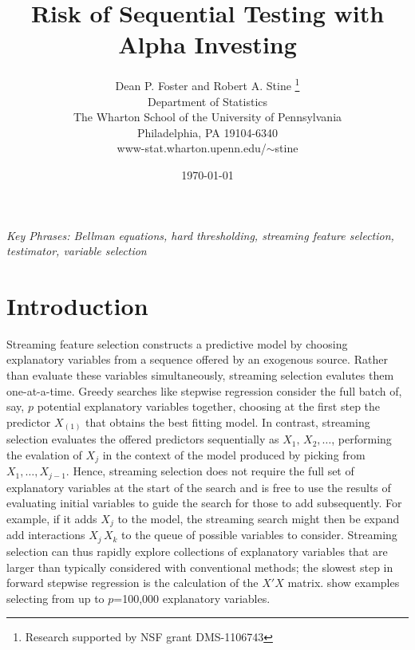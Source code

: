 \documentclass[12pt]{article}
\title{ Risk of Sequential Testing with Alpha Investing }
\author{
        Dean P. Foster and Robert A. Stine
        \thanks{Research supported by NSF grant DMS-1106743 }  \\
        Department of Statistics            \\
        The Wharton School of the University of Pennsylvania \\
        Philadelphia, PA 19104-6340                          \\
        www-stat.wharton.upenn.edu/$\sim$stine 
}
\date{\today}
\begin{document}
\maketitle 


\vspace{0.05in}

\noindent
{\it Key Phrases: Bellman equations, hard thresholding, streaming feature
 selection, testimator, variable selection}

\clearpage


\section{ Introduction }


 Streaming feature selection constructs a predictive model by choosing
 explanatory variables from a sequence offered by an exogenous source.  Rather
 than evaluate these variables simultaneously, streaming selection evalutes them
 one-at-a-time.  Greedy searches like stepwise regression consider the full
 batch of, say, $p$ potential explanatory variables together, choosing at the
 first step the predictor $X_{(1)}$ that obtains the best fitting model.  In
 contrast, streaming selection evaluates the offered predictors sequentially as
 $X_1, \, X_2, \ldots$, performing the evalation of $X_j$ in the context of the
 model produced by picking from $X_1, \ldots, X_{j-1}$.  Hence, streaming
 selection does not require the full set of explanatory variables at the start
 of the search and is free to use the results of evaluating initial variables to
 guide the search for those to add subsequently.  For example, if it adds $X_j$
 to the model, the streaming search might then be expand add interactions $X_j
 \, X_k$ to the queue of possible variables to consider.  Streaming selection
 can thus rapidly explore collections of explanatory variables that are larger
 than typically considered with conventional methods; the slowest step in
 forward stepwise regression is the calculation of the $X'X$ matrix.
  \citet{fosterlin10} show examples selecting from up to $p$=100,000 explanatory
 variables.
\end{document}
